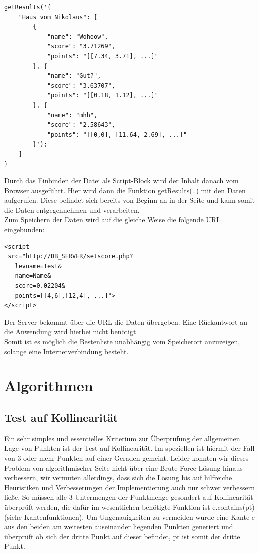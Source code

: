 \documentclass[a4paper,twocolumn]{scrartcl}
\newcommand{\lststyle}[1]{{\usefont{T1}{pcr}{m}{n}\small\selectfont#1}}
\renewcommand{\texttt}[1]{{\usefont{T1}{pcr}{m}{n}\small\selectfont#1}}
\begin{document}
\newblock
\begin{lstlisting}
getResults('{
    "Haus vom Nikolaus": [
        {
            "name": "Wohoow",
            "score": "3.71269",
            "points": "[[7.34, 3.71], ...]"
        }, {
            "name": "Gut?",
            "score": "3.63707",
            "points": "[[0.18, 1.12], ...]"
        }, {
            "name": "mhh",
            "score": "2.58643",
            "points": "[[0,0], [11.64, 2.69], ...]"
        }');
    ]
}
\end{lstlisting}
\newblock
Durch das Einbinden der Datei als Script-Block wird der Inhalt danach vom Browser ausgeführt. Hier wird dann die Funktion \texttt{getResults(..)} mit den Daten aufgerufen. Diese befindet sich bereits von Beginn an in der Seite und kann somit die Daten entgegennehmen und verarbeiten.\\
Zum Speichern der Daten wird auf die gleiche Weise die folgende URL eingebunden:\\

\begin{lstlisting}
<script
 src="http://DB_SERVER/setscore.php?
   levname=Test&
   name=Name&
   score=0.02204&
   points=[[4,6],[12,4], ...]">
</script>
\end{lstlisting}
Der Server bekommt über die URL die Daten übergeben. Eine Rückantwort an die Anwendung wird hierbei nicht benötigt.\\
Somit ist es möglich die Bestenliste unabhängig vom Speicherort anzuzeigen, solange eine Internetverbindung besteht.


\section{Algorithmen}

\subsection{Test auf Kollinearität}
Ein sehr simples und essentielles Kriterium zur Überprüfung der allgemeinen Lage von Punkten ist der Test auf Kollinearität. Im speziellen ist hiermit der Fall von 3 oder mehr Punkten auf einer Geraden gemeint. Leider konnten wir dieses Problem von algorithmischer Seite nicht über eine Brute Force Lösung hinaus verbessern, wir vermuten allerdings, dass sich die Lösung bis auf hilfreiche Heuristiken und Verbesserungen der Implementierung auch nur schwer verbessern ließe. So müssen alle 3-Untermengen der Punktmenge gesondert auf Kollinearität überprüft werden, die dafür im wesentlichen benötigte Funktion ist \lststyle{e.contains(pt)} (siehe Kantenfunktionen). Um Ungenauigkeiten zu vermeiden wurde eine Kante \lststyle{e} aus den beiden am weitesten auseinander liegenden Punkten generiert und überprüft ob sich der dritte Punkt auf dieser befindet, \lststyle{pt} ist somit der dritte Punkt.  
\end{document}

